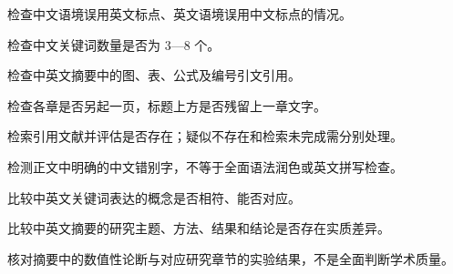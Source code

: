 \documentclass[12pt,a4paper]{article}
\begin{document}
\Needspace{26mm}\par{}\par 检查中文语境误用英文标点、英文语境误用中文标点的情况。\par
\Needspace{26mm}\par{}\par 检查中文关键词数量是否为 3—8 个。\par
\Needspace{26mm}\par{}\par 检查中英文摘要中的图、表、公式及编号引文引用。\par
\Needspace{26mm}\par{}\par 检查各章是否另起一页，标题上方是否残留上一章文字。\par
\Needspace{26mm}\par{}\par 检索引用文献并评估是否存在；疑似不存在和检索未完成需分别处理。\par
\Needspace{26mm}\par{}\par 检测正文中明确的中文错别字，不等于全面语法润色或英文拼写检查。\par
\Needspace{26mm}\par{}\par 比较中英文关键词表达的概念是否相符、能否对应。\par
\Needspace{26mm}\par{}\par 比较中英文摘要的研究主题、方法、结果和结论是否存在实质差异。\par
\Needspace{26mm}\par{}\par 核对摘要中的数值性论断与对应研究章节的实验结果，不是全面判断学术质量。\par
\end{document}
